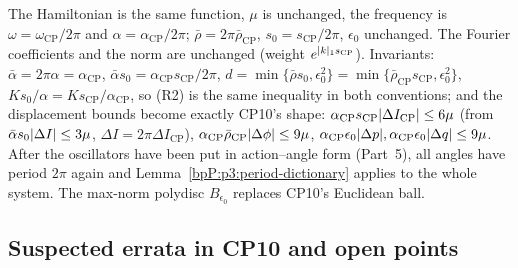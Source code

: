 \begin{remark}
The Hamiltonian is the same function, $\mu$ is unchanged, the frequency is $\omega=\omega_{\mathrm{CP}}/2\pi$ and $\alpha=\alpha_{\mathrm{CP}}/2\pi$; $\bar\rho=2\pi\bar\rho_{\mathrm{CP}}$, $s_0=s_{\mathrm{CP}}/2\pi$, $\epsilon_0$ unchanged. The Fourier coefficients and the norm are unchanged (weight $e^{\lvert k\rvert_1s_{\mathrm{CP}}}$). Invariants: $\bar\alpha=2\pi\alpha=\alpha_{\mathrm{CP}}$, $\bar\alpha s_0=\alpha_{\mathrm{CP}}s_{\mathrm{CP}}/2\pi$, $d=\min\{\bar\rho s_0,\epsilon_0^2\}=\min\{\bar\rho_{\mathrm{CP}}s_{\mathrm{CP}},\epsilon_0^2\}$, $Ks_0/\alpha=Ks_{\mathrm{CP}}/\alpha_{\mathrm{CP}}$, so (R2) is the same inequality in both conventions; and the displacement bounds become exactly CP10's shape: $\alpha_{\mathrm{CP}}s_{\mathrm{CP}}\lvert \Delta I_{\mathrm{CP}}\rvert\le6\mu$ (from $\bar\alpha s_0\lvert \Delta I\rvert\le3\mu$, $\Delta I=2\pi\Delta I_{\mathrm{CP}}$), $\alpha_{\mathrm{CP}}\bar\rho_{\mathrm{CP}}\lvert \Delta\phi\rvert\le9\mu$, $\alpha_{\mathrm{CP}}\epsilon_0\lvert \Delta p\rvert,\alpha_{\mathrm{CP}}\epsilon_0\lvert \Delta q\rvert\le9\mu$. After the oscillators have been put in action--angle form (Part~5), all angles have period $2\pi$ again and Lemma~\ref{bpP:p3:period-dictionary} applies to the whole system. The max-norm polydisc $B_{\epsilon_0}$ replaces CP10's Euclidean ball.
\end{remark}

\subsection{Suspected errata in CP10 and open points}\label{bpP:p2:errata}

